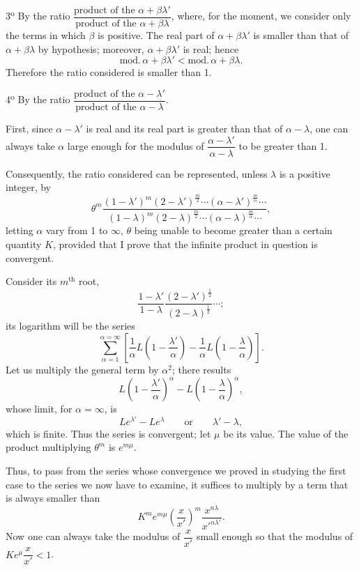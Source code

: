 \documentclass[11pt]{article}
\begin{document}
3\textsuperscript{o} By the ratio $\dfrac{\text{product of the }\alpha+\beta\lambda'}{\text{product of the }\alpha+\beta\lambda}$, where, for the moment, we consider only the terms in which $\beta$ is positive. The real part of $\alpha+\beta\lambda'$ is smaller than that of $\alpha+\beta\lambda$ by hypothesis; moreover, $\alpha+\beta\lambda'$ is real; hence
\[
\mathrm{mod}.\,\alpha+\beta\lambda'<\mathrm{mod}.\,\alpha+\beta\lambda.
\]
Therefore the ratio considered is smaller than 1.

4\textsuperscript{o} By the ratio $\dfrac{\text{product of the }\alpha-\lambda'}{\text{product of the }\alpha-\lambda}$.

First, since $\alpha-\lambda'$ is real and its real part is greater than that of $\alpha-\lambda$, one can always take $\alpha$ large enough for the modulus of $\dfrac{\alpha-\lambda'}{\alpha-\lambda}$ to be greater than 1.

Consequently, the ratio considered can be represented, unless $\lambda$ is a positive integer, by
\[
\theta^m
\frac{(1-\lambda')^m(2-\lambda')^{\frac m2}\cdots(\alpha-\lambda')^{\frac m\alpha}\cdots}
{(1-\lambda)^m(2-\lambda)^{\frac m2}\cdots(\alpha-\lambda)^{\frac m\alpha}\cdots},
\]
letting $\alpha$ vary from 1 to $\infty$, $\theta$ being unable to become greater than a certain quantity $K$, provided that I prove that the infinite product in question is convergent.

Consider its $m^{\text{th}}$ root,
\[
\frac{1-\lambda'}{1-\lambda}\frac{(2-\lambda')^{\frac12}}{(2-\lambda)^{\frac12}}\cdots;
\]
its logarithm will be the series
\[
\sum_{\alpha=1}^{\alpha=\infty}\left[\frac1\alpha L\left(1-\frac{\lambda'}{\alpha}\right)-\frac1\alpha L\left(1-\frac{\lambda}{\alpha}\right)\right].
\]
Let us multiply the general term by $\alpha^2$; there results
\[
L\left(1-\frac{\lambda'}{\alpha}\right)^\alpha-L\left(1-\frac{\lambda}{\alpha}\right)^\alpha,
\]
whose limit, for $\alpha=\infty$, is
\[
L e^{\lambda'}-L e^{\lambda}\qquad \text{or}\qquad \lambda'-\lambda,
\]
which is finite. Thus the series is convergent; let $\mu$ be its value. The value of the product multiplying $\theta^m$ is $e^{m\mu}$.

Thus, to pass from the series whose convergence we proved in studying the first case to the series we now have to examine, it suffices to multiply by a term that is always smaller than
\[
K^m e^{m\mu}\left(\frac{x}{x'}\right)^m\frac{x^{n\lambda}}{x'^{n\lambda'}}.
\]
Now one can always take the modulus of $\dfrac{x}{x'}$ small enough so that the modulus of $Ke^\mu\dfrac{x}{x'}<1$.
\end{document}
